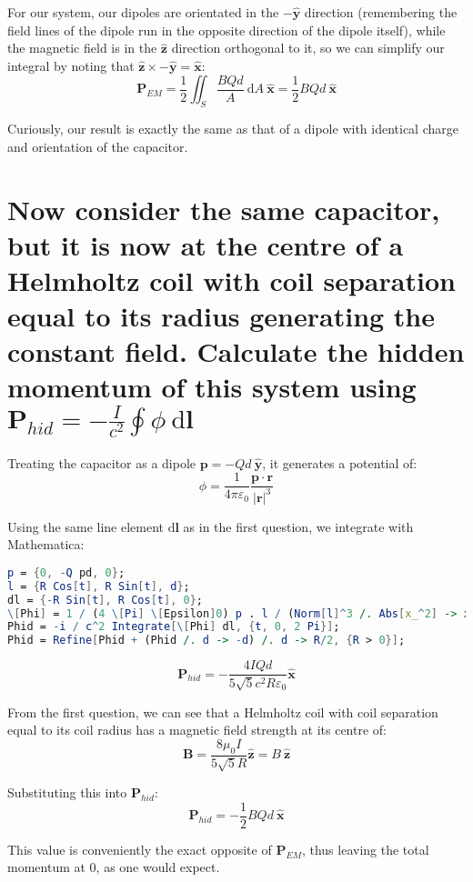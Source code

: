 \documentclass[a4paper]{scrartcl}
\begin{document}
For our system, our dipoles are orientated in the \(-\hat{\mathbf{y}}\) direction (remembering the field lines of the dipole run in the opposite direction of the dipole itself), while the magnetic field is in the \(\hat{\mathbf{z}}\) direction orthogonal to it, so we can simplify our integral by noting that \(\hat{\mathbf{z}} \times -\hat{\mathbf{y}} = \hat{\mathbf{x}}\):
\[\mathbf{P}_{EM} = \frac{1}{2} \iint_S \frac{B Q d}{A} \:\mathrm{d}A \:\hat{\mathbf{x}} = \frac{1}{2} B Q d \:\hat{\mathbf{x}}\]

Curiously, our result is exactly the same as that of a dipole with identical charge and orientation of the capacitor.

\section{Now consider the same capacitor, but it is now at the centre of a Helmholtz coil with coil separation equal to its radius generating the constant field. Calculate the hidden momentum of this system using \(\mathbf{P}_{hid} = -\frac{I}{c^2} \oint \phi \:\mathrm{d}\mathbf{l}\)}
Treating the capacitor as a dipole \(\mathbf{p} = -Q d \:\hat{\mathbf{y}}\), it generates a potential of:
\[\phi = \frac{1}{4 \pi \varepsilon_0} \frac{\mathbf{p} \cdot \mathbf{r}}{|\mathbf{r}|^3}\]

Using the same line element \(\mathrm{d}\mathbf{l}\) as in the first question, we integrate with Mathematica:
\begin{lstlisting}[language = Mathematica, frame = single]
p = {0, -Q pd, 0};
l = {R Cos[t], R Sin[t], d};
dl = {-R Sin[t], R Cos[t], 0};
\[Phi] = 1 / (4 \[Pi] \[Epsilon]0) p . l / (Norm[l]^3 /. Abs[x_^2] -> x^2);
Phid = -i / c^2 Integrate[\[Phi] dl, {t, 0, 2 Pi}];
Phid = Refine[Phid + (Phid /. d -> -d) /. d -> R/2, {R > 0}];
\end{lstlisting}
\[\mathbf{P}_{hid} = -\frac{4 I Q d}{5 \sqrt{5} c^2 R \varepsilon_0} \hat{\mathbf{x}}\]

From the first question, we can see that a Helmholtz coil with coil separation equal to its coil radius has a magnetic field strength at its centre of:
\[\mathbf{B} = \frac{8 \mu_0 I}{5 \sqrt{5} R} \hat{\mathbf{z}} = B \:\hat{\mathbf{z}}\]

Substituting this into \(\mathbf{P}_{hid}\):
\[\mathbf{P}_{hid} = -\frac{1}{2} B Q d \:\hat{\mathbf{x}}\]

This value is conveniently the exact opposite of \(\mathbf{P}_{EM}\), thus leaving the total momentum at 0, as one would expect.
\end{document}
